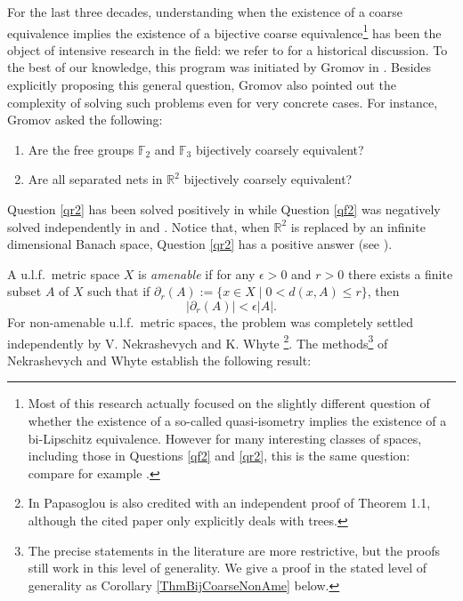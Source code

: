 \documentclass[11pt]{amsart}
\newcommand{\bbR}{\mathbb{R}}
\newcommand{\R}{\mathbb{R}}
\numberwithin{equation}{section}
\theoremstyle{definition}
\theoremstyle{remark}
\numberwithin{equation}{section}
\begin{document}
For the last three decades, understanding when the existence of a coarse equivalence implies the existence of a bijective coarse equivalence\footnote{Most of this research actually focused on the slightly different question of whether the existence of a so-called quasi-isometry implies the existence of a bi-Lipschitz equivalence.  However for many interesting classes of spaces, including those in Questions \eqref{qf2} and \eqref{qr2}, this is the same question: compare for example \cite[Corollary 1.4.14]{NowakYuBook}.} has been the object of intensive research in the field: we refer to \cite{GenevoisTessera22} for a historical discussion. To the best of our knowledge, this program was initiated by Gromov  in \cite[\S1.A$'$]{GromovBook1993CambridgePress}. Besides  explicitly proposing  this general question, Gromov also pointed out the complexity of solving such problems even for very concrete cases. For instance, Gromov asked the following:  
\begin{enumerate}
\item \label{qf2} Are the free groups $\mathbb  F_2$ and $\mathbb F_3$ bijectively coarsely equivalent?
\item \label{qr2} Are all separated nets in $\R^2$ bijectively coarsely equivalent?
\end{enumerate}
Question \eqref{qr2} has been solved positively in \cite[Corollary 1]{Papasoglu1995GeoDedicata} while Question \eqref{qf2} was negatively solved independently in \cite[Section 3 and Theorem 4.1]{McMullen1998GAFA} and \cite[Theorem 1.1]{BuragoKleiner1998GAFA}. Notice that, when $\bbR^2$ is replaced by an infinite dimensional Banach space,  Question \eqref{qr2} has a positive answer (see \cite[Proposition 4.2]{LindenstraussMatouskovaPreissIsraelJournal2000}).

A u.l.f.\ metric space $X$ is \emph{amenable} if for any $\epsilon>0$ and $r>0$ there exists a finite subset $A$ of $X$ such that if $\partial_r(A):=\{x\in X\mid 0<d(x,A)\leq r\}$, then
$$
|\partial_r(A)|< \epsilon|A|. 
$$
For non-amenable u.l.f.\ metric spaces, the problem was completely settled independently by V. Nekrashevych \cite{Nekrashevych98} and K. Whyte \cite[Theorems 1.1 and 1.4]{Whyte1999Duke}\footnote{In \cite[page 104]{Harpe2000book} Papasoglou is also credited with an independent proof of Theorem 1.1, although the cited paper \cite{Papasoglu1995GeoDedicata} only explicitly deals with trees.}.  The methods\footnote{The precise statements in the literature are more restrictive, but the proofs still work in this level of generality.  We give a proof in the stated level of generality as Corollary \ref{ThmBijCoarseNonAme} below.} of Nekrashevych and Whyte establish the following result:
\end{document}
